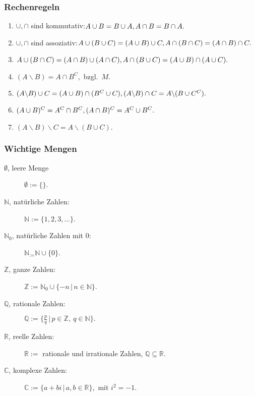 \documentclass[a4paper, 9pt, DIV=24]{scrartcl}
\newcommand{\N}{\mathbb{N}}
\begin{document}
\subsubsection{Rechenregeln}
\begin{enumerate}[label={(}\arabic*{)}]
 \item $\cup, \cap$ sind kommutativ:\newline $A \cup B = B \cup A, \\ A \cap B = B \cap A.$
 \item $\cup, \cap$ sind assoziativ:\newline $A \cup (B \cup C) = (A \cup B) \cup C, \\ A \cap (B \cap C) = (A \cap B) \cap C.$
 \item $A \cup (B \cap C) = (A \cap B) \cup (A \cap C), \\ A \cap (B \cup C) = (A \cup B) \cap (A \cup C).$
 \item $(A\backslash B) = A \cap B^C, $ bzgl.\ $M$.
 \item $(A\backslash B) \cup C = (A \cup B) \cap (B^C \cup C), \\ (A\backslash B) \cap C = A \backslash (B \cup C^C).$
 \item $(A \cup B)^C = A^C \cap B^C, \\ (A \cap B)^C = A^C \cup B^C.$
 \item $(A\backslash B) \backslash C = A \backslash (B \cup C).$
\end{enumerate}
\subsubsection{Wichtige Mengen}
\begin{description}
 \item[$\emptyset$, leere Menge] $\emptyset := \{\}$.
 \item[$\N$, natürliche Zahlen:] $\N := \{1,2,3,\dots\}$.
 \item[$\N_0$, natürliche Zahlen mit 0:] $\N_ := \N \cup \{0\}$.
 \item[$\mathbb{Z}$, ganze Zahlen:] $\mathbb{Z} := \N_0 \cup \{-n\, |\, n \in \N\}$.
 \item[$\mathbb{Q}$, rationale Zahlen:] $\mathbb{Q} := \{\frac{p}{q}\, |\, p \in \mathbb{Z},\ q \in \N \} .$
 \item[$\mathbb{R}$, reelle Zahlen:] $\mathbb{R} := $ rationale und irrationale Zahlen, $\mathbb{Q} \subseteq \mathbb{R}$.
 \item[$\mathbb{C}$, komplexe Zahlen:] $\mathbb{C} := \{a + bi\, |\, a, b \in \mathbb{R}\}, $ mit $i^2 = -1$.
\end{description}
\end{document}

